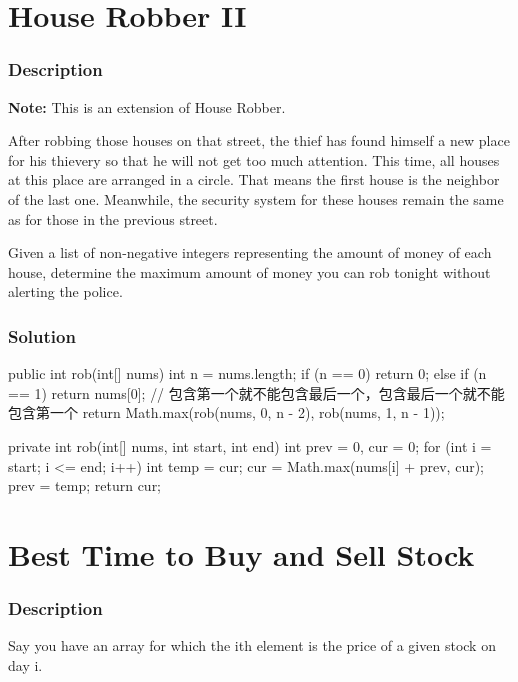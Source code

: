 \newpage

\section{House Robber II} %

\subsubsection{Description}
\textbf{Note:} This is an extension of House Robber.

After robbing those houses on that street, the thief has found himself a new place for his thievery so that he will not get too much attention. This time, all houses at this place are arranged in a circle. That means the first house is the neighbor of the last one. Meanwhile, the security system for these houses remain the same as for those in the previous street.

Given a list of non-negative integers representing the amount of money of each house, determine the maximum amount of money you can rob tonight without alerting the police.

\subsubsection{Solution}

\begin{Code}
public int rob(int[] nums) {
    int n = nums.length;
    if (n == 0) {
        return 0;
    } else if (n == 1) {
        return nums[0];
    }
    // 包含第一个就不能包含最后一个，包含最后一个就不能包含第一个
    return Math.max(rob(nums, 0, n - 2), rob(nums, 1, n - 1));
}

private int rob(int[] nums, int start, int end) {
    int prev = 0, cur = 0;
    for (int i = start; i <= end; i++) {
        int temp = cur;
        cur = Math.max(nums[i] + prev, cur);
        prev = temp;
    }
    return cur;
}
\end{Code}

\newpage

\section{Best Time to Buy and Sell Stock} %

\subsubsection{Description}
Say you have an array for which the ith element is the price of a given stock on day i.


